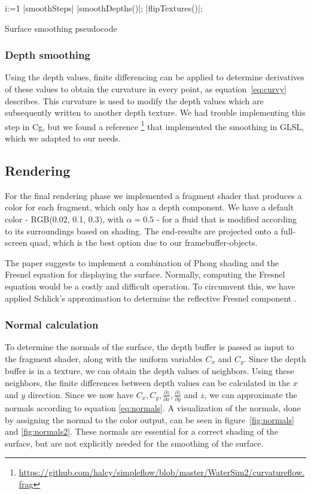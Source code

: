 \begin{algorithm}
	\begin{program}
	\caption
	\FOR i:=1 \TO |smoothSteps| \DO
		|smoothDepths()|;
		|flipTextures()|;
	\end{program}
	\label{program:smooth}
	\caption{Surface smoothing pseudocode}
\end{algorithm}


\subsubsection{Depth smoothing}
Using the depth values, finite differencing can be applied to determine derivatives of these values to obtain the curvature in every point, as equation~\ref{eq:curvy} describes.
This curvature is used to modify the depth values which are subsequently written to another depth texture.
We had trouble implementing this step in Cg, but we found a reference \footnote{\url{https://github.com/halcy/simpleflow/blob/master/WaterSim2/curvatureflow.frag}} that implemented the smoothing in GLSL, which we adapted to our needs.

\subsection{Rendering}
For the final rendering phase we implemented a fragment shader that produces a color for each fragment, which only has a depth component.
We have a default color - RGB(0.02, 0.1, 0.3), with $\alpha = 0.5$ - for a fluid that is modified according to its surroundings based on shading. 
The end-results are projected onto a full-screen quad, which is the best option due to our framebuffer-objects.

The paper suggests to implement a combination of Phong shading and the Fresnel equation for displaying the surface. 
Normally, computing the Fresnel equation would be a costly and difficult operation.
To circumvent this, we have applied Schlick's approximation to determine the reflective Fresnel component \cite{schlick1994inexpensive}.

\subsubsection{Normal calculation}
To determine the normals of the surface, the depth buffer is passed as input to the fragment shader, along with the uniform variables $C_x$ and $C_y$.
Since the depth buffer is in a texture, we can obtain the depth values of neighbors.
Using these neighbors, the finite differences between depth values can be calculated in the $x$ and $y$ direction.
Since we now have $C_x, C_y, \frac{\partial z}{\partial x}, \frac{\partial z}{\partial y}$ and $z$, we can approximate the normals according to equation \ref{eq:normals}.
A visualization of the normals, done by assigning the normal to the color output, can be seen in figure~\ref{fig:normals} and \ref{fig:normals2}. 
These normals are essential for a correct shading of the surface, but are not explicitly needed for the smoothing of the surface.


